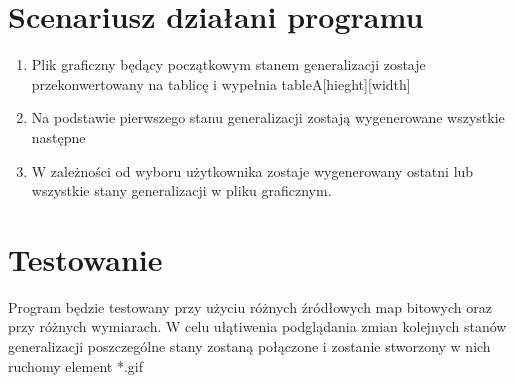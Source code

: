 \documentclass[12pt, letterpaper, ]{article}
\begin{document}
	\section[Scenariusz działania programu]{Scenariusz działani programu}
	\begin{enumerate}
		\item Plik graficzny będący początkowym stanem generalizacji zostaje przekonwertowany na tablicę i wypełnia tableA[hieght][width]
		\item Na podstawie pierwszego stanu generalizacji zostają wygenerowane wszystkie następne
		\item W zależności od wyboru użytkownika zostaje wygenerowany ostatni lub wszystkie stany generalizacji w pliku graficznym. 
		
	\end{enumerate}
	
	\section[Testowanie]{Testowanie}
	Program będzie testowany przy użyciu różnych źródłowych map bitowych oraz przy różnych wymiarach. W celu ułątiwenia podglądania zmian kolejnych stanów generalizacji poszczególne stany zostaną połączone i zostanie stworzony w nich ruchomy element *.gif
		
		
		
		
\end{document}
